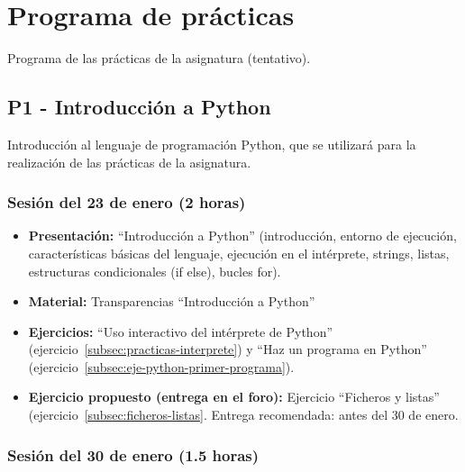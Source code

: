 \documentclass[a4paper,12pt]{article}
\begin{document}
\section{Programa de prácticas}

Programa de las prácticas de la asignatura (tentativo).

\subsection{P1 - Introducción a Python}

Introducción al lenguaje de programación Python, que se utilizará para la realización de las prácticas de la asignatura.

\subsubsection{Sesión del 23 de enero (2 horas)}

\begin{itemize}
\item \textbf{Presentación:} ``Introducción a Python'' (introducción, entorno de ejecución, características básicas del lenguaje, ejecución en el intérprete, strings, listas, estructuras condicionales (if else), bucles for).
\item \textbf{Material:} Transparencias ``Introducción a Python''
\item \textbf{Ejercicios:} ``Uso interactivo del intérprete de Python'' (ejercicio~\ref{subsec:practicas-interprete}) y ``Haz un programa en Python'' (ejercicio~\ref{subsec:eje-python-primer-programa}).

\item \textbf{Ejercicio propuesto (entrega en el foro):} Ejercicio ``Ficheros y listas'' (ejercicio~\ref{subsec:ficheros-listas}.
   Entrega recomendada: antes del 30 de enero.
\end{itemize}

\subsubsection{Sesión del 30 de enero (1.5 horas)}
\end{document}
